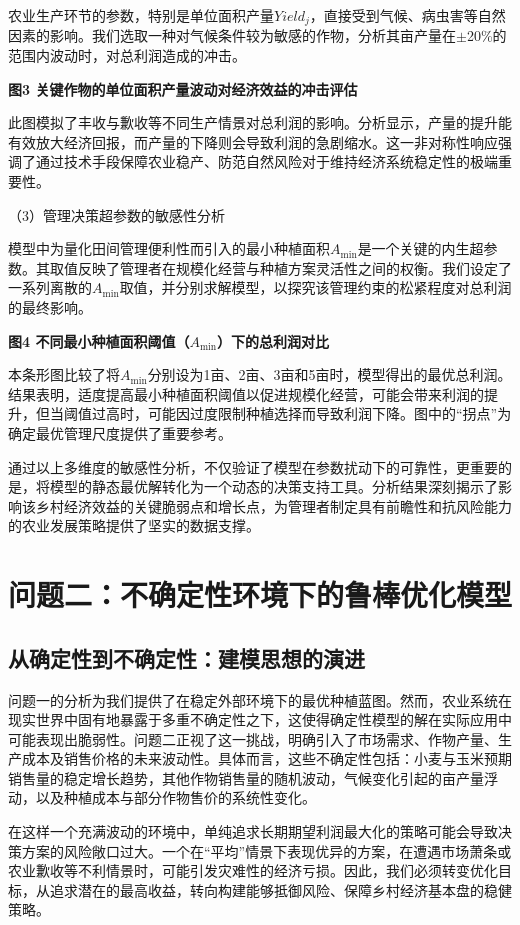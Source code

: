 \documentclass[withoutpreface,bwprint]{cumcmthesis} %
\begin{document}
农业生产环节的参数，特别是单位面积产量$Yield_j$，直接受到气候、病虫害等自然因素的影响。我们选取一种对气候条件较为敏感的作物，分析其亩产量在$\pm$20\%的范围内波动时，对总利润造成的冲击。

\textbf{图3 关键作物的单位面积产量波动对经济效益的冲击评估}

此图模拟了丰收与歉收等不同生产情景对总利润的影响。分析显示，产量的提升能有效放大经济回报，而产量的下降则会导致利润的急剧缩水。这一非对称性响应强调了通过技术手段保障农业稳产、防范自然风险对于维持经济系统稳定性的极端重要性。

（3）管理决策超参数的敏感性分析

模型中为量化田间管理便利性而引入的最小种植面积$A_{\min}$是一个关键的内生超参数。其取值反映了管理者在规模化经营与种植方案灵活性之间的权衡。我们设定了一系列离散的$A_{\min}$取值，并分别求解模型，以探究该管理约束的松紧程度对总利润的最终影响。

\textbf{图4 不同最小种植面积阈值（$A_{\min}$）下的总利润对比}

本条形图比较了将$A_{\min}$分别设为1亩、2亩、3亩和5亩时，模型得出的最优总利润。结果表明，适度提高最小种植面积阈值以促进规模化经营，可能会带来利润的提升，但当阈值过高时，可能因过度限制种植选择而导致利润下降。图中的“拐点”为确定最优管理尺度提供了重要参考。


通过以上多维度的敏感性分析，不仅验证了模型在参数扰动下的可靠性，更重要的是，将模型的静态最优解转化为一个动态的决策支持工具。分析结果深刻揭示了影响该乡村经济效益的关键脆弱点和增长点，为管理者制定具有前瞻性和抗风险能力的农业发展策略提供了坚实的数据支撑。


\section{问题二：不确定性环境下的鲁棒优化模型}

\subsection{从确定性到不确定性：建模思想的演进}

问题一的分析为我们提供了在稳定外部环境下的最优种植蓝图。然而，农业系统在现实世界中固有地暴露于多重不确定性之下，这使得确定性模型的解在实际应用中可能表现出脆弱性。问题二正视了这一挑战，明确引入了市场需求、作物产量、生产成本及销售价格的未来波动性。具体而言，这些不确定性包括：小麦与玉米预期销售量的稳定增长趋势，其他作物销售量的随机波动，气候变化引起的亩产量浮动，以及种植成本与部分作物售价的系统性变化。

在这样一个充满波动的环境中，单纯追求长期期望利润最大化的策略可能会导致决策方案的风险敞口过大。一个在“平均”情景下表现优异的方案，在遭遇市场萧条或农业歉收等不利情景时，可能引发灾难性的经济亏损。因此，我们必须转变优化目标，从追求潜在的最高收益，转向构建能够抵御风险、保障乡村经济基本盘的稳健策略。
\end{document}
